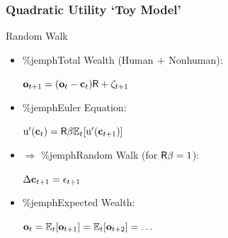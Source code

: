 \documentclass{beamer}\usepackage{dcolumn}
\begin{document}
\begin{frame}
\frametitle{Quadratic Utility `Toy Model'}

\begin{block}{\cite{hallRandomWalk} Random Walk}
\phantom{.}
\begin{itemize}
\item \%jemph{Total Wealth} (Human$\,+\,$Nonhuman):\\
\begin{center}
{$\mathbf{o}_{t+1} = (\mathbf{o}_{t}-\mathbf{c}_{t})\mathsf{R}+\zeta_{t+1}$}
\end{center}
\item \%jemph{Euler Equation}: \\
\begin{center}
{${\mathrm{u}}^{\prime}(\mathbf{c}_{t}) = \mathsf{R}\beta \mathbb{E}_{t}[{\mathrm{u}}^{\prime}(\mathbf{c}_{t+1})]$}
\end{center}
\item $\Rightarrow$ \%jemph{Random Walk} (for $\mathsf{R}\beta=1$): \\
\begin{center}
{$\Delta \mathbf{c}_{t+1} = \epsilon_{t+1}$}
\end{center}
\item \%jemph{Expected Wealth}: \\
\begin{center}
{$\mathbf{o}_{t} = \mathbb{E}_{t}[\mathbf{o}_{t+1}] = \mathbb{E}_{t}[\mathbf{o}_{t+2}] = \dots$}
\end{center}
\end{itemize}
\end{block}

\end{frame}
\end{document}
